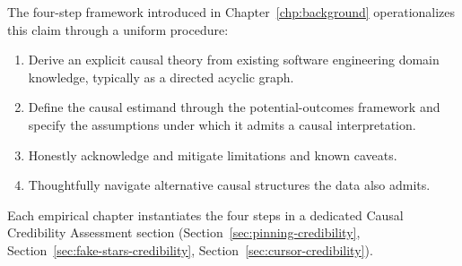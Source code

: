 The four-step framework introduced in Chapter~\ref{chp:background} operationalizes this claim through a uniform procedure: 
\begin{enumerate}
  \item Derive an explicit causal theory from existing software engineering domain knowledge, typically as a directed acyclic graph.
  \item Define the causal estimand through the potential-outcomes framework and specify the assumptions under which it admits a causal interpretation.
  \item Honestly acknowledge and mitigate limitations and known caveats.
  \item Thoughtfully navigate alternative causal structures the data also admits.
\end{enumerate}
Each empirical chapter instantiates the four steps in a dedicated Causal Credibility Assessment section (Section~\ref{sec:pinning-credibility}, Section~\ref{sec:fake-stars-credibility}, Section~\ref{sec:cursor-credibility}).

